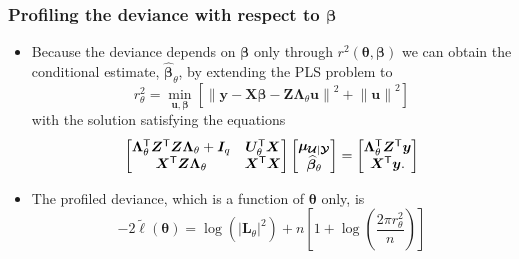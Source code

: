 \documentclass[dvipsnames,pdflatex,beamer]{beamer}
\newcommand{\bLt}{\ensuremath{\bm\Lambda_\theta}}
\begin{document}
\begin{frame}
  \frametitle{Profiling the deviance with respect to $\bm\beta$}
  \begin{itemize}
  \item Because the deviance depends on $\bm\beta$ only through
    $r^2(\bm\theta,\bm\beta)$ we can obtain the conditional estimate,
    $\widehat{\bm\beta}_\theta$, by extending the PLS problem to
    \begin{displaymath}
      r^2_\theta=\min_{\bm u,\bm\beta}
      \left[\left\|\bm y-\bm X\bm\beta-\bm Z\bLt\bm u\right\|^2 +
      \left\|\bm u\right\|^2\right]
    \end{displaymath}
    with the solution satisfying the equations
    \begin{displaymath}
      \begin{bmatrix}
        \bLt\trans\bm Z\trans\bm Z\bLt+\bm I_q & \bm
        U_\theta\trans\bm X\\
        \bm X\trans\bm Z\bLt & \bm X\trans\bm X
      \end{bmatrix}
      \begin{bmatrix}
        \bm\mu_{\bc U|\bc Y}\\\widehat{\bm\beta}_\theta
      \end{bmatrix}=
      \begin{bmatrix}\bLt\trans\bm Z\trans\bm y\\\bm X\trans\bm y .
      \end{bmatrix}
    \end{displaymath}
  \item The profiled deviance, which is a function of $\bm\theta$
    only, is
    \begin{displaymath}
      -2\tilde{\ell}(\bm\theta)=\log(|\bm L_\theta|^2)+
      n\left[1+\log\left(\frac{2\pi r^2_\theta}{n}\right)\right]
    \end{displaymath}
  \end{itemize}
\end{frame}
\end{document}
